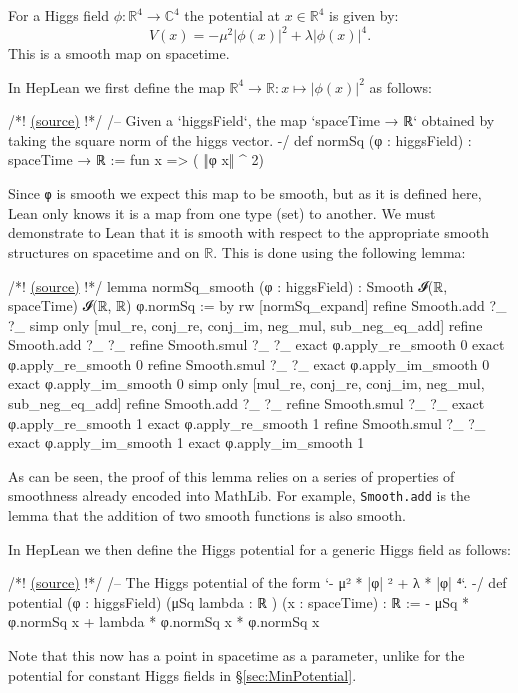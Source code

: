 \documentclass[a4paper, 11pt]{article}
\newcommand{\codeLink}[1]{
  \vspace{-0.5cm}\hfill\href{https://github.com/HEPLean/HepLean/blob/1b951994ae3d882242b02d23957ef1ee7fa05f3d/HepLean/#1}{(source)}
  }
\begin{document}
For a Higgs field $\phi : \mathbb{R}^4 \to \mathbb{C}^4$ the potential at $x \in  \mathbb{R}^4$ is given by:
\begin{equation*}
  V (x) = - \mu^2 |\phi(x)|^2 + \lambda |\phi(x)|^4.
  \end{equation*}
This is a smooth map on spacetime.

In HepLean we first define the map $\mathbb{R}^4 \to \mathbb{R} : x \mapsto |\phi(x)|^2$ as follows:
\begin{code}
 /*!\codeLink{StandardModel/HiggsField.lean\#L402}!*/
/-- Given a `higgsField`, the map `spaceTime → ℝ` obtained 
by taking the square norm of the higgs vector.  -/
def normSq (φ : higgsField) : spaceTime → ℝ := fun x => ( ‖φ x‖ ^ 2)
\end{code}

Since \lstinline|φ| is smooth we expect this map to be smooth, but as it is defined here, Lean only knows it is a map from one type (set) to another. We must demonstrate to Lean that it is smooth with respect to the appropriate smooth structures on spacetime and on $\mathbb{R}$. This is done using the following lemma:
\begin{code}
 /*!\codeLink{StandardModel/HiggsField.lean\#L417}!*/	
lemma normSq_smooth (φ : higgsField) : 
    Smooth 𝓘(ℝ, spaceTime) 𝓘(ℝ, ℝ) φ.normSq := by
  rw [normSq_expand]
  refine Smooth.add ?_ ?_
  simp only [mul_re, conj_re, conj_im, neg_mul, sub_neg_eq_add]
  refine Smooth.add ?_ ?_
  refine Smooth.smul ?_ ?_
  exact φ.apply_re_smooth 0
  exact φ.apply_re_smooth 0
  refine Smooth.smul ?_ ?_
  exact φ.apply_im_smooth 0
  exact φ.apply_im_smooth 0
  simp only [mul_re, conj_re, conj_im, neg_mul, sub_neg_eq_add]
  refine Smooth.add ?_ ?_
  refine Smooth.smul ?_ ?_
  exact φ.apply_re_smooth 1
  exact φ.apply_re_smooth 1
  refine Smooth.smul ?_ ?_
  exact φ.apply_im_smooth 1
  exact φ.apply_im_smooth 1
\end{code}
As can be seen, the proof of this lemma relies on a series of properties of smoothness already encoded into MathLib. For example, \lstinline|Smooth.add| is the lemma that the addition of two smooth functions is also smooth. 

In HepLean we then define the Higgs potential for a generic Higgs field as follows:
\begin{code}
 /*!\codeLink{StandardModel/HiggsField.lean\#L443}!*/
/-- The Higgs potential of the form `- μ² * |φ| ² + λ * |φ| ⁴`. -/
def potential (φ : higgsField) (μSq lambda : ℝ ) (x : spaceTime) :  ℝ :=
  - μSq * φ.normSq x + lambda * φ.normSq x * φ.normSq x
\end{code}
Note that this now has a point in spacetime as a parameter, unlike for the potential for constant Higgs fields in \S\ref{sec:MinPotential}. 
\end{document}
